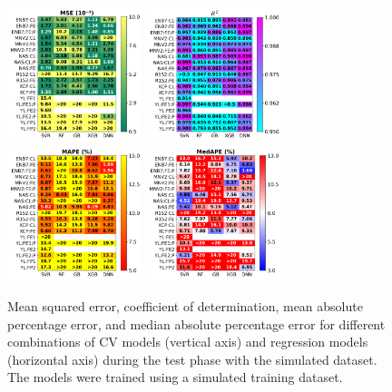 \documentclass[10pt]{iopart}
\begin{document}
\begin{figure}
\centering
\includegraphics[width=0.35\textwidth]{Fig6a}
\includegraphics[width=0.35\textwidth]{Fig6b}
\includegraphics[width=0.35\textwidth]{Fig6c}
\includegraphics[width=0.35\textwidth]{Fig6d}
\caption{
Mean squared error, coefficient of determination, mean absolute percentage error, and median absolute percentage error
for different combinations of CV models (vertical axis) and regression models (horizontal axis)
during the test phase with the simulated dataset.
The models were trained using a simulated training dataset.
}\label{Fig6}
\end{figure}
\end{document}
